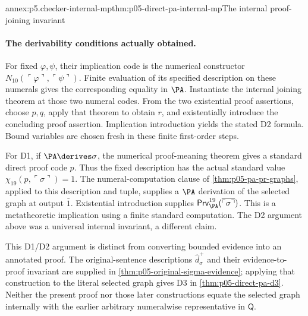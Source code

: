 \begin{annexitem}{annex:p5.checker-internal-mp}{thm:p05-direct-pa-internal-mp}{The internal proof-joining invariant}
\paragraph{The derivability conditions actually obtained.}
For fixed \(\varphi,\psi\), their implication code is the numerical
constructor \(N_{10}(\ulcorner\varphi\urcorner,
\ulcorner\psi\urcorner)\).  Finite evaluation of its specified description
on these numerals gives the corresponding equality in \(\PA\).
Instantiate the internal joining theorem at those two numeral codes.
From the two existential proof assertions, choose \(p,q\), apply that
theorem to obtain \(r\), and existentially introduce the concluding proof
assertion.  Implication introduction yields the stated D2 formula.  Bound
variables are chosen fresh in these finite first-order steps.

For D1, if \(\PA\derives\sigma\), the numerical proof-meaning theorem
gives a standard direct proof code \(p\).  Thus the fixed description has
the actual standard value \(\chi_{19}(p,\ulcorner\sigma\urcorner)=1\).
The numeral-computation clause of \cref{thm:p05-pa-pr-graphs}, applied to
this description and tuple, supplies a \(\PA\) derivation of the selected
graph at output \(\bar1\).  Existential introduction supplies
\(\mathsf{Prv}^{19}_{\PA}(\overline{\ulcorner\sigma\urcorner})\).
This is a metatheoretic implication using a finite standard computation.
The D2 argument above was a universal internal invariant, a different claim.

This D1/D2 argument is distinct from converting bounded evidence into an
annotated proof.  The original-sentence descriptions
\(\widehat d_\sigma^+\) and their evidence-to-proof invariant are supplied
in \cref{thm:p05-original-sigma-evidence}; applying that construction to
the literal selected graph gives D3 in \cref{thm:p05-direct-pa-d3}.
Neither the present proof nor those later constructions equate the selected
graph internally with the earlier arbitrary numeralwise representative
in \(\mathsf Q\).
\end{annexitem}
